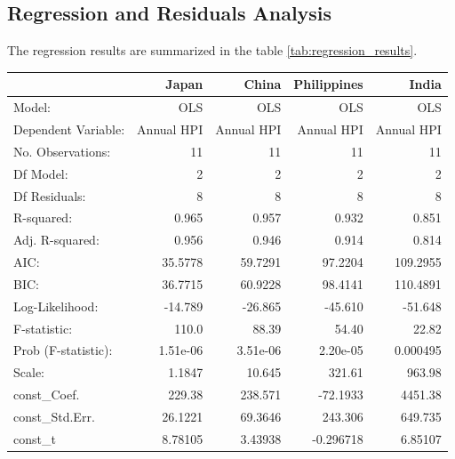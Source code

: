\documentclass[11pt]{article}
\begin{document}
\subsection{Regression and Residuals Analysis}\label{result_analysis}
The regression results are summarized in the table \ref{tab:regression_results}. 
\begin{table}[]
\centering
\renewcommand{\arraystretch}{0.8}
\begin{tabular}{lrrrr}
\toprule
                           &        Japan &        China & Philippines &        India \\
\midrule
                    Model: &          OLS &          OLS &         OLS &          OLS \\
       Dependent Variable: &   Annual HPI &   Annual HPI &  Annual HPI &   Annual HPI \\
         No. Observations: &           11 &           11 &          11 &           11 \\
                 Df Model: &            2 &            2 &           2 &            2 \\
             Df Residuals: &            8 &            8 &           8 &            8 \\
                R-squared: &        0.965 &        0.957 &       0.932 &        0.851 \\
           Adj. R-squared: &        0.956 &        0.946 &       0.914 &        0.814 \\
                      AIC: &      35.5778 &      59.7291 &     97.2204 &     109.2955 \\
                      BIC: &      36.7715 &      60.9228 &     98.4141 &     110.4891 \\
           Log-Likelihood: &      -14.789 &      -26.865 &     -45.610 &      -51.648 \\
              F-statistic: &        110.0 &        88.39 &       54.40 &        22.82 \\
       Prob (F-statistic): &     1.51e-06 &     3.51e-06 &    2.20e-05 &     0.000495 \\
                    Scale: &       1.1847 &       10.645 &      321.61 &       963.98 \\
               const\_Coef. &       229.38 &      238.571 &    -72.1933 &      4451.38 \\
            const\_Std.Err. &      26.1221 &      69.3646 &     243.306 &      649.735 \\
                   const\_t &      8.78105 &      3.43938 &   -0.296718 &      6.85107 \\

\end{tabular}
\end{table}
\end{document}
